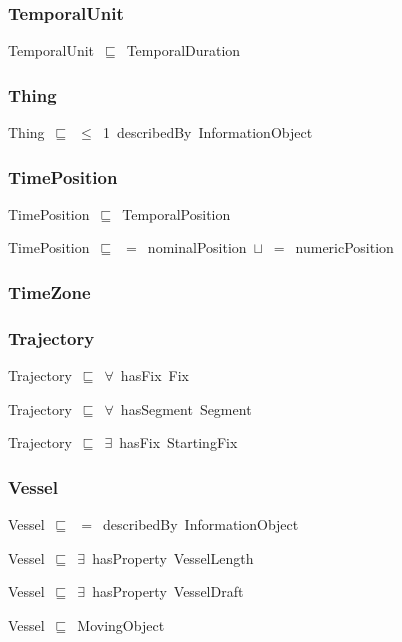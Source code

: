 \documentclass{article}
\begin{document}
\subsubsection*{TemporalUnit}

TemporalUnit~\ensuremath{\sqsubseteq}~TemporalDuration~

\subsubsection*{Thing}

Thing~\ensuremath{\sqsubseteq}~\ensuremath{\leq}~1~describedBy~InformationObject~

\subsubsection*{TimePosition}

TimePosition~\ensuremath{\sqsubseteq}~TemporalPosition~

TimePosition~\ensuremath{\sqsubseteq}~\ensuremath{=}~nominalPosition~\ensuremath{\sqcup}~\ensuremath{=}~numericPosition~

\subsubsection*{TimeZone}

\subsubsection*{Trajectory}

Trajectory~\ensuremath{\sqsubseteq}~\ensuremath{\forall}~hasFix~Fix~

Trajectory~\ensuremath{\sqsubseteq}~\ensuremath{\forall}~hasSegment~Segment~

Trajectory~\ensuremath{\sqsubseteq}~\ensuremath{\exists}~hasFix~StartingFix~

\subsubsection*{Vessel}

Vessel~\ensuremath{\sqsubseteq}~\ensuremath{=}~describedBy~InformationObject~

Vessel~\ensuremath{\sqsubseteq}~\ensuremath{\exists}~hasProperty~VesselLength~

Vessel~\ensuremath{\sqsubseteq}~\ensuremath{\exists}~hasProperty~VesselDraft~

Vessel~\ensuremath{\sqsubseteq}~MovingObject~
\end{document}
